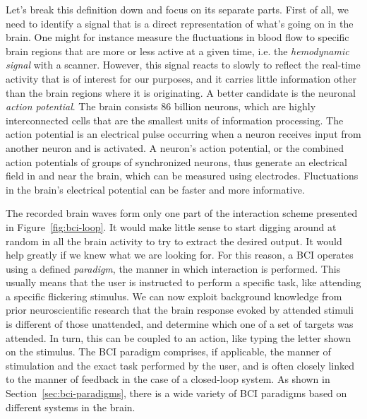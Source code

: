 Let's break this definition down and focus on its separate parts.
First of all, we need to identify a signal that is a direct representation of
what's going on in the brain.
One might for instance measure the fluctuations in blood flow to specific brain
regions that are more or less active at a given time, i.e. the
\emph{hemodynamic signal} with a scanner.
However, this signal reacts to slowly to reflect the real-time activity that is
of interest for our purposes, and it carries little information other than the
brain regions where it is originating.
A better candidate is the neuronal \emph{action potential}.
The brain consists 86 billion neurons, which are highly interconnected cells that are
the smallest units of information processing.
The action potential is an electrical pulse occurring when a neuron receives
input from another neuron and is activated.
A neuron's action potential, or the combined action potentials of groups of
synchronized neurons, thus generate an electrical field in and near the brain,
which can be measured using electrodes.
Fluctuations in the brain's electrical potential can be faster and more
informative.

The recorded brain waves form only one part of the interaction scheme presented
in Figure~\ref{fig:bci-loop}.
It would make little sense to start digging around at random in all the brain
activity to try to extract the desired output.
It would help greatly if we knew what we are looking for.
For this reason, a BCI operates using a defined \emph{paradigm}, the manner in
which interaction is performed.
This usually means that the user is instructed to perform a specific task, like
attending a specific flickering stimulus.
We can now exploit background knowledge from prior neuroscientific research
that the brain response evoked by attended stimuli is different of those
unattended,
and determine which one of a set of targets was attended.
In turn, this can be coupled to an action, like typing the letter shown on the
stimulus.
The BCI paradigm comprises, if applicable, the manner of stimulation and the
exact task performed by the user, and is often closely linked to the manner of
feedback in the case of a closed-loop system.
As shown in Section~\ref{sec:bci-paradigms}, there is a wide variety of BCI
paradigms based on different systems in the brain.

